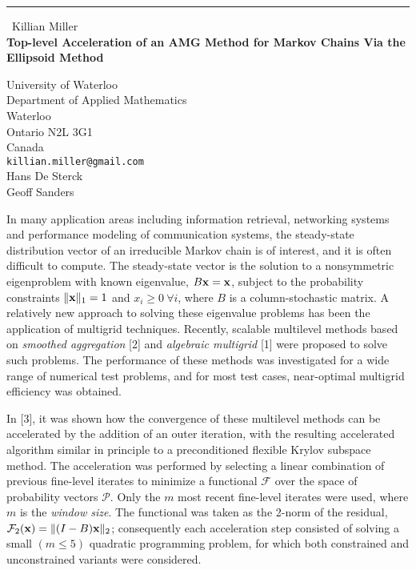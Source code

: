 \documentclass{report}
\begin{document}
\begin{center}
\rule{6in}{1pt} \
{\large Killian Miller \\
{\bf Top-level Acceleration of an AMG Method for Markov Chains Via the Ellipsoid Method}}

University of Waterloo \\ Department of Applied Mathematics \\ Waterloo \\ Ontario N2L 3G1 \\ Canada
\\
{\tt killian.miller@gmail.com}\\
Hans De Sterck\\
Geoff Sanders\end{center}

\newcommand{\mF}{\mathcal{F}}
\newcommand{\mP}{\mathcal{P}}
\newcommand{\mV}{\mathcal{V}}
\newcommand{\bx}{{\bf x}}

In many application areas including information retrieval, networking
systems and performance modeling of communication systems, the
steady-state distribution vector of an irreducible Markov chain is of
interest, and it is often difficult to compute. The steady-state vector
is the solution to a nonsymmetric eigenproblem with known eigenvalue,
$B\bx = \bx$, subject to the probability constraints $\|\bx\|_1 = 1$ and
$x_i \geq 0~\forall i$, where $B$ is a column-stochastic matrix. A
relatively new approach to solving these eigenvalue problems has been the
application of multigrid techniques. Recently, scalable multilevel
methods based on {\em smoothed aggregation} [2] and {\em algebraic
multigrid} [1] were proposed to solve such problems. The performance of
these methods was investigated for a wide range of numerical test
problems, and for most test cases, near-optimal multigrid efficiency was
obtained.

In [3], it was shown how the convergence of these multilevel methods can
be accelerated by the addition of an outer iteration, with the resulting
accelerated algorithm similar in principle to a preconditioned flexible
Krylov subspace method. The acceleration was performed by selecting a
linear combination of previous fine-level iterates to minimize a
functional $\mF$
over the space of probability vectors $\mP$. Only the $m$ most recent
fine-level iterates were used, where $m$ is the {\em window size}. The
functional was taken as the 2-norm of the residual, $\mF_2(\bx) =
\|(I-B)\bx\|_2$; consequently each acceleration step consisted of solving
a small $(m \leq 5)$ quadratic programming problem, for which both
constrained and unconstrained variants were considered.
\end{document}
